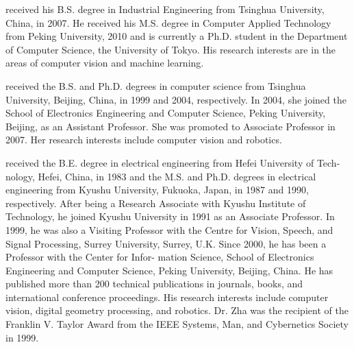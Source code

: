 \documentclass{mva2011}
\begin{document}
{\small


}
 received his B.S. degree in Industrial Engineering from Tsinghua University, China, in 2007. He received his M.S. degree in Computer Applied Technology
  from Peking University, 2010 and is currently a Ph.D. student in the Department of Computer Science, the University of Tokyo. His research interests are in the areas of computer vision and machine learning.

  received the B.S. and Ph.D. degrees
in computer science from Tsinghua University,
Beijing, China, in 1999 and 2004, respectively.
In 2004, she joined the School of Electronics Engineering
and Computer Science, Peking University,
Beijing, as an Assistant Professor. She was promoted
to Associate Professor in 2007. Her research interests
include computer vision and robotics.


 received the B.E. degree in 	
electrical engineering from Hefei University of Tech-	
nology, Hefei, China, in 1983 and the M.S. and 	
Ph.D. degrees in electrical engineering from Kyushu 	
University, Fukuoka, Japan, in 1987 and 1990, 	
respectively. 	
After being a Research Associate with Kyushu 	
Institute of Technology, he joined Kyushu University 	
in 1991 as an Associate Professor. In 1999, he was 	
also a Visiting Professor with the Centre for Vision, 	
Speech, and Signal Processing, Surrey University, 	
Surrey, U.K. Since 2000, he has been a Professor with the Center for Infor-	
mation Science, School of Electronics Engineering and Computer Science, 	
Peking University, Beijing, China. He has published more than 200 technical 	
publications in journals, books, and international conference proceedings. His 	
research interests include computer vision, digital geometry processing, and 	
robotics. 	
Dr. Zha was the recipient of the Franklin V. Taylor Award from the IEEE 	
Systems, Man, and Cybernetics Society in 1999. 	
\end{document}
